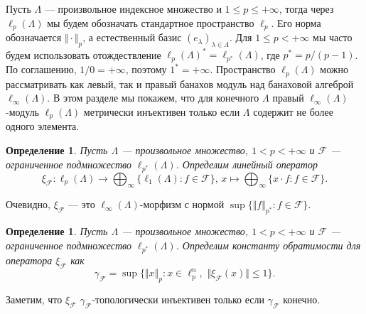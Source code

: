 \documentclass[12pt]{article}
\newtheorem{definition}[theorem]{Определение}
\begin{document}
Пусть $\Lambda$ --- произвольное индексное множество 
и $1\leq p\leq +\infty$, тогда через $\ell_p(\Lambda)$ мы будем обозначать 
стандартное пространство $\ell_p$. Его норма обозначается $\Vert\cdot\Vert_p$, а 
естественный базис $(e_\lambda)_{\lambda\in\Lambda}$. 
Для $1\leq p<+\infty$ мы часто будем использовать отождествление
$\ell_p(\Lambda)^*=\ell_{p^*}(\Lambda)$, где $p^*=p/(p-1)$. 
По соглашению, $1/0=+\infty$, поэтому $1^*=+\infty$. 
Пространство $\ell_p(\Lambda)$ можно рассматривать как левый, так и правый 
банахов модуль над банаховой алгеброй $\ell_\infty(\Lambda)$. В этом разделе 
мы покажем, что для конечного $\Lambda$ 
правый $\ell_\infty(\Lambda)$-модуль $\ell_p(\Lambda)$ метрически инъективен 
только если $\Lambda$ содержит не более одного элемента.

\begin{definition}\label{StdEmbd} 
    Пусть $\Lambda$ --- произвольное множество, $1<p<+\infty$ 
    и $\mathcal{F}$ --- ограниченное подмножество $\ell_{p^*}(\Lambda)$. 
    Определим линейный оператор
    \[
        \xi_{\mathcal{F}}: 
        \ell_p(\Lambda)\to\bigoplus_\infty\{\ell_1(\Lambda):f\in\mathcal{F}\},\,
        x \mapsto \bigoplus_\infty\{ x\cdot f: f\in\mathcal{F}\}.
    \]
\end{definition}

Очевидно, $\xi_{\mathcal{F}}$ --- это $\ell_\infty(\Lambda)$-морфизм с нормой 
$\sup\{\Vert f\Vert_{p^*}: f\in\mathcal{F}\}$.

\begin{definition}\label{StdEmbdCoercv}
    Пусть $\Lambda$ --- произвольное множество, $1<p<+\infty$ 
    и $\mathcal{F}$ --- ограниченное подмножество $\ell_{p^*}(\Lambda)$. 
    Определим константу обратимости для оператора $\xi_{\mathcal{F}}$ как
    \[
        \gamma_{\mathcal{F}}=\sup\{
            \Vert x\Vert_p: 
            x\in\ell_p^n,\,\, \Vert \xi_{\mathcal{F}}(x)\Vert\leq 1
        \}.
    \]
\end{definition}

Заметим, что $\xi_{\mathcal{F}}$ $\gamma_{\mathcal{F}}$-топологически инъективен 
только если $\gamma_{\mathcal{F}}$ конечно.
\end{document}
